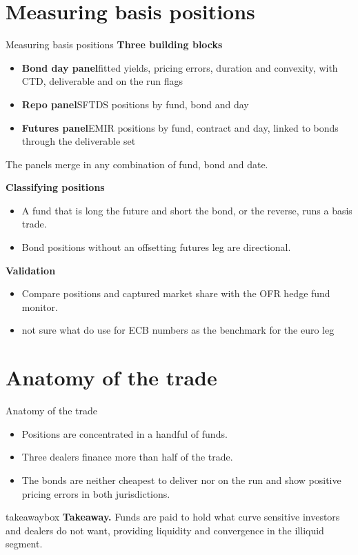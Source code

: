 \documentclass[aspectratio=169,11pt]{beamer}
\newcommand{\todohl}[1]{\colorbox{yellow!45}{\strut #1}}
\newcommand{\takeaway}[1]{%
  \begin{beamercolorbox}[sep=0.6em,wd=\textwidth]{takeawaybox}
    \textbf{Takeaway.} #1
  \end{beamercolorbox}}
\begin{document}
\section{Measuring basis positions}
\begin{frame}{Measuring basis positions}
  \textbf{Three building blocks}
  \begin{itemize}
    \item \textbf{Bond day panel}\quad fitted yields, pricing errors, duration and convexity, with CTD, deliverable and on the run flags
    \item \textbf{Repo panel}\quad SFTDS positions by fund, bond and day
    \item \textbf{Futures panel}\quad EMIR positions by fund, contract and day, linked to bonds through the deliverable set
  \end{itemize}
  \smallskip
  The panels merge in any combination of fund, bond and date.
  \medskip

  \textbf{Classifying positions}
  \begin{itemize}
    \item A fund that is long the future and short the bond, or the reverse, runs a basis trade.
    \item Bond positions without an offsetting futures leg are directional.
  \end{itemize}
  \medskip
  \textbf{Validation}
  \begin{itemize}
    \item Compare positions and captured market share with the OFR hedge fund monitor.
    \item \todohl{not sure what do use for ECB numbers as the benchmark for the euro leg}
  \end{itemize}
\end{frame}

\section{Anatomy of the trade}
\begin{frame}{Anatomy of the trade}
  \begin{itemize}
    \item Positions are concentrated in a handful of funds.
    \item Three dealers finance more than half of the trade.
    \item The bonds are neither cheapest to deliver nor on the run and show positive pricing errors in both jurisdictions.
  \end{itemize}
  \bigskip
  \takeaway{Funds are paid to hold what curve sensitive investors and dealers do not want, providing liquidity and convergence in the illiquid segment.}
\end{frame}
\end{document}
